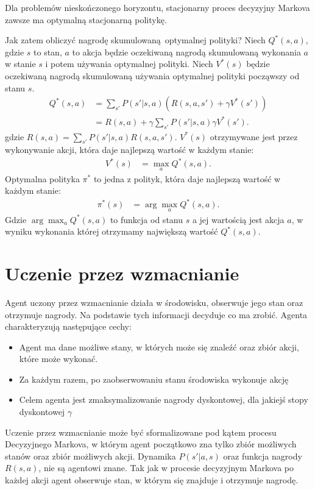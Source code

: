 \documentclass[a4paper, 12pt,oneside]{book}
\begin{document}
Dla problemów nieskończonego horyzontu, stacjonarny proces decyzyjny Markova
zawsze ma optymalną stacjonarną politykę.\cite{ai_foundations_policies}

Jak zatem obliczyć nagrodę skumulowaną optymalnej polityki? Niech $Q^*(s,a)$,
gdzie $s$ to stan, $a$ to akcja będzie oczekiwaną nagrodą skumulowaną wykonania
$a$ w stanie $s$ i potem używania optymalnej polityki. Niech $V^*(s)$ będzie
oczekiwaną nagrodą skumulowaną używania optymalnej polityki począwszy od stanu
$s$.
\begin{equation} \label{optimal_policy_1}
\begin{split}
	Q^*(s,a) &= \sum_{s'}P(s'|s,a)(R(s,a,s') + \gamma V^*(s'))\\
	&= R(s,a) + \gamma \sum_{s'}P(s'|s,a) \gamma V^*(s').
\end{split}
\end{equation}
gdzie $R(s,a) = \sum_{s'}P(s'|s,a)R(s,a,s')$.
$V^*(s)$ otrzymywane jest przez wykonywanie akcji, która daje najlepszą wartość
w każdym stanie:
\begin{equation} \label{optimal_policy_2}
\begin{split}
	V^*(s) &= \max_{a} Q^*(s,a).
\end{split}
\end{equation}
Optymalna polityka $\pi^*$ to jedna z polityk, która daje najlepszą wartość w
każdym stanie:
\begin{equation} \label{optimal_policy_3}
\begin{split}
	\pi^*(s) &= \arg\max_{a} Q^*(s,a).
\end{split}
\end{equation}
Gdzie $\arg\max_{a} Q^*(s,a)$ to funkcja od stanu $s$ a jej wartością jest
akcja $a$, w wyniku wykonania której otrzymamy największą wartość $Q^*(s,a)$.

\section{Uczenie przez wzmacnianie}
Agent uczony przez wzmacnianie działa w środowisku, obserwuje jego stan oraz
otrzymuje nagrody. Na podstawie tych informacji decyduje co ma zrobić. Agenta
charakteryzują następujące cechy:
\begin{itemize}
	\setlength\itemsep{-0.4em}
\item Agent ma dane możliwe stany, w których może się znaleźć oraz zbiór akcji,
	które może wykonać.
\item Za każdym razem, po zaobserwowaniu stanu środowiska wykonuje akcję
\item Celem agenta jest zmaksymalizowanie nagrody dyskontowej, dla jakiejś
	stopy dyskontowej $\gamma$
\end{itemize}
Uczenie przez wzmacnianie może być sformalizowane pod kątem procesu Decyzyjnego
Markova, w którym agent początkowo zna tylko zbiór możliwych stanów oraz zbiór
możliwych akcji. Dynamika $P(s'|a,s)$ oraz funkcja nagrody $R(s,a)$, nie są
agentowi znane. Tak jak w procesie decyzyjnym Markova po każdej akcji agent
obserwuje stan, w którym się znajduje i otrzymuje nagrodę.
\end{document}
